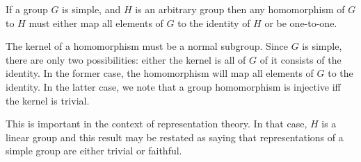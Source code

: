 \documentclass[12pt]{article}
\begin{document}
If a group $G$ is simple, and $H$ is an arbitrary group then any
homomorphism of $G$ to $H$ must either map all elements of $G$ to the
identity of $H$ or be one-to-one.

The kernel of a homomorphism must be a normal subgroup.  Since $G$ is
simple, there are only two possibilities: either the kernel is all of
$G$ of it consists of the identity.  In the former case, the
homomorphism will map all elements of $G$ to the identity.  In the
latter case, we note that a group homomorphism is injective iff the kernel
is trivial.

This is important in the context of representation theory.  In that
case, $H$ is a linear group and this result may be restated as saying
that representations of a simple group are either trivial or faithful.
\end{document}
